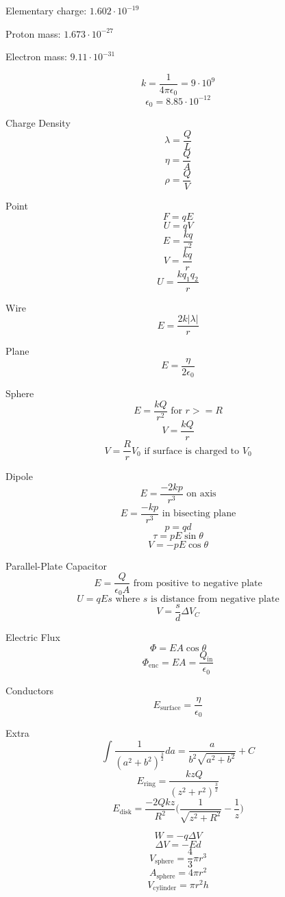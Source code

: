 \documentclass[twocolumn]{article}
\begin{document}
Elementary charge: $1.602\cdot 10^{-19}$

Proton mass: $1.673\cdot 10^{-27}$

Electron mass: $9.11\cdot 10^{-31}$

\[k=\frac{1}{4\pi\epsilon_0}=9\cdot 10^9\]
\[\epsilon_0=8.85\cdot 10^{-12}\]

Charge Density
\[\lambda = \frac{Q}{L}\]
\[\eta = \frac{Q}{A}\]
\[\rho = \frac{Q}{V}\]

Point
\[F=qE\]
\[U=qV\]
\[E=\frac{kq}{r^2}\]
\[V=\frac{kq}{r}\]
\[U=\frac{kq_1q_2}{r}\]

Wire
\[E=\frac{2k|\lambda |}{r}\]

Plane
\[E=\frac{\eta}{2\epsilon_0}\]

Sphere
\[E=\frac{kQ}{r^2}\text{ for }r >= R\]
\[V=\frac{kQ}{r}\]
\[V=\frac{R}{r}V_0\text{ if surface is charged to }V_0\]

Dipole
\[E=\frac{-2kp}{r^3}\text{ on axis}\]
\[E=\frac{-kp}{r^3}\text{ in bisecting plane}\]
\[p=qd\]
\[\tau =pE\sin\theta\]
\[V=-pE\cos\theta\]

Parallel-Plate Capacitor
\[E=\frac{Q}{\epsilon_0 A}\text{ from positive to negative plate}\]
\[U=qEs\text{ where $s$ is distance from negative plate}\]
\[V=\frac{s}{d}\Delta V_C\]

Electric Flux
\[\Phi = EA\cos\theta\]
\[\Phi_\text{enc}=EA=\frac{Q_\text{in}}{\epsilon_0}\]

Conductors
\[E_\text{surface}=\frac{\eta}{\epsilon_0}\]

Extra
\[\int \frac{1}{(a^2+b^2)^\frac{3}{2}}da=\frac{a}{b^2 \sqrt{a^2+b^2}}+C\]
\[E_\text{ring}=\frac{kzQ}{(z^2+r^2)^\frac{3}{2}}\]
\[E_\text{disk}=\frac{-2Qkz}{R^2}\Big(\frac{1}{\sqrt{z^2+R^2}}-\frac{1}{z}\Big)\]

\[W=-q\Delta V\]
\[\Delta V=-Ed\]
\[V_\text{sphere}=\frac{4}{3}\pi r^3\]
\[A_\text{sphere}=4\pi r^2\]
\[V_\text{cylinder}=\pi r^2 h\]
\end{document}
